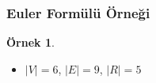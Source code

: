 \documentclass[dvipsnames]{beamer}
\theoremstyle{definition}
\theoremstyle{example}
\newtheorem{ornek}[theorem]{Örnek}
\theoremstyle{plain}
\begin{document}
\begin{frame}
  \frametitle{Euler Formülü Örneği}

  \begin{ornek}
    \begin{center}
    \end{center}

    \begin{itemize}
     \item $|V| = 6$, $|E| = 9$, $|R| = 5$
    \end{itemize}
  \end{ornek}
\end{frame}
% 
% 
% 
% 
% 
% 
% 
% 
% 
% 
% 
\end{document}
